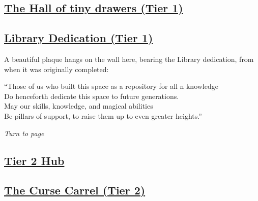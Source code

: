 \documentclass[sheet]{GL2020}
\begin{document}
\begin{center}\section*{\underline{The Hall of tiny drawers (Tier 1)}}\end{center}
\label{HallofTinyDrawers}

\clearpage

\begin{center}\section*{\underline{Library Dedication (Tier 1)}}\end{center}
\label{LibraryDedication}

A beautiful plaque hangs on the wall here, bearing the Library dedication, from when it was originally completed:

\begin{center}
``Those of us who built this space as a repository for all \pEarth{}n knowledge\\
Do henceforth dedicate this space to future generations.\\

May our skills, knowledge, and magical abilities\\
Be pillars of support, to raise them up to even greater heights.''\\
\end{center}

\emph{Turn to page~\pageref{TierOneHub}}

\clearpage



\begin{center}\section*{\underline{Tier 2 Hub}}\end{center}
\label{TierTwoHub}

\clearpage


\begin{center}\section*{\underline{The Curse Carrel (Tier 2)}}\end{center}
\label{CurseCarrel}

\clearpage
\end{document}
